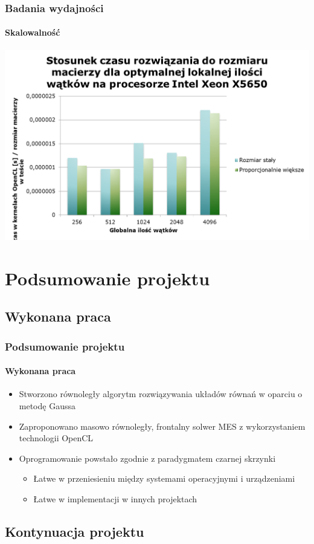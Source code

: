 \documentclass{beamer}
\begin{document}
\begin{frame}
\frametitle{Badania wydajności}
\framesubtitle{Skalowalność}
\hfill\includegraphics[scale=0.45]{czas6.png}\hspace*{\fill}
\end{frame}

\section{Podsumowanie projektu}
\subsection{Wykonana praca}

\begin{frame}
\frametitle{Podsumowanie projektu}
\framesubtitle{Wykonana praca}
\begin{itemize}

\item Stworzono równoległy algorytm rozwiązywania układów równań w oparciu o metodę Gaussa
\item Zaproponowano masowo równoległy, frontalny solwer MES z wykorzystaniem technologii OpenCL
\item Oprogramowanie powstało zgodnie z paradygmatem czarnej skrzynki
	\begin{itemize}
	\item Łatwe w przeniesieniu między systemami operacyjnymi i urządzeniami
	\item Łatwe w implementacji w innych projektach
	\end{itemize}
\end{itemize}
\end{frame}

\subsection{Kontynuacja projektu}
\end{document}
